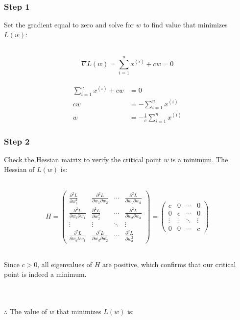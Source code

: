 \documentclass{article}
\begin{document}
\subsubsection*{Step 1}
\parbox{\textwidth}{
Set the gradient equal to zero and solve for $w$ to find value that minimizes $L(w)$:
}\\

$$\nabla L(w) = \sum_{i=1}^{n} x^{(i)} + cw = 0$$\\

\begin{align*}
\sum_{i=1}^{n} x^{(i)} + cw &= 0 \\
cw &= -\sum_{i=1}^{n} x^{(i)} \\
w &= -\frac{1}{c}\sum_{i=1}^{n} x^{(i)}
\end{align*}

\subsubsection*{Step 2}
\parbox{\textwidth}{
Check the Hessian matrix to verify the critical point $w$ is a minimum. The Hessian of $L(w)$ is:
}\\


$$H = \begin{pmatrix} 
\frac{\partial^2 L}{\partial w_1^2} & \frac{\partial^2 L}{\partial w_1 \partial w_2} & \cdots & \frac{\partial^2 L}{\partial w_1 \partial w_d} \\
\frac{\partial^2 L}{\partial w_2 \partial w_1} & \frac{\partial^2 L}{\partial w_2^2} & \cdots & \frac{\partial^2 L}{\partial w_2 \partial w_d} \\
\vdots & \vdots & \ddots & \vdots \\
\frac{\partial^2 L}{\partial w_d \partial w_1} & \frac{\partial^2 L}{\partial w_d \partial w_2} & \cdots & \frac{\partial^2 L}{\partial w_d^2}
\end{pmatrix} = 
\begin{pmatrix} 
c & 0 & \cdots & 0 \\
0 & c & \cdots & 0 \\
\vdots & \vdots & \ddots & \vdots \\
0 & 0 & \cdots & c
\end{pmatrix} $$\\

\parbox{\textwidth}{
Since $c > 0$, all eigenvalues of $H$ are positive, which confirms that our critical point is indeed a minimum.
}\\

\subsubsection*{\normalfont}{$\therefore$ The value of $w$ that minimizes $L(w)$ is:}
\end{document}
